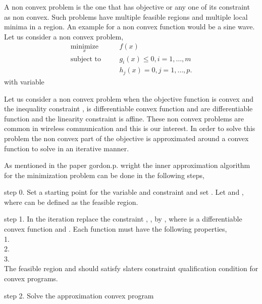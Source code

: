 A non convex problem is the one that has objective or any one of its constraint as non convex. Such problems have multiple feasible regions and multiple local minima in a region. An example for a non convex function would be a sine wave. Let us consider a non convex problem,
\begin{eqnarray}
\underset{x}{\text{minimize}} \quad && f(x) \\
\text{subject to} \quad && g_i(x) \leq 0, i = 1,\dotsc,m\\
&& h_j(x) = 0, j = 1,\dotsc,p.
\end{eqnarray} 
with variable 
\par
Let us consider a non convex problem when the objective function  is convex and the inequality constraint ,   is differentiable convex function and    are differentiable function and the linearity constraint is affine. These non convex problems are common in wireless communication and this is our interest. In order to solve this problem the non convex part of the objective is approximated around a convex function to solve in an iterative manner. 
\par
As mentioned in the paper gordon.p. wright the inner approximation algorithm for the minimization problem can be done in the following steps,\\
\par
step 0. Set a starting point for the variable and constraint  and set . Let  and , where  can be defined as the feasible region.\\
\par
step 1. In the  iteration replace the constraint , , by , where  is a differentiable convex function and . Each function  must  have the following properties,\\
1. \\
2. \\
3. \\
The feasible region  and  should satisfy slaters constraint qualification condition for convex programs.\\
\par
step 2. Solve the approximation convex program\\

